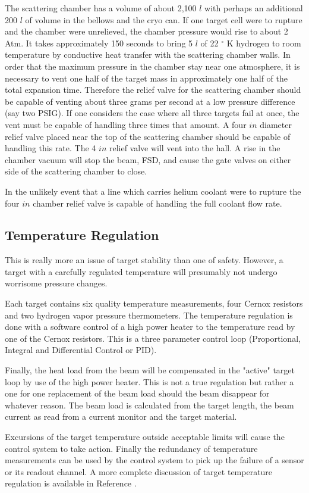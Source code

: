 {The scattering chamber has a volume of about 2,100 $l$ with perhaps an 
additional 200 $l$ of volume in the bellows and the cryo can.
If one target cell were to rupture and the chamber were unrelieved,
the chamber pressure would rise to about 2 Atm.
It takes approximately 150 seconds to
bring 5 $l$ of 22 $^\circ$ K hydrogen to room temperature
by conductive heat transfer with the scattering chamber walls.
In order that the maximum pressure 
in the chamber stay near one atmosphere, it is necessary to
vent one half of the target mass in approximately one half of the
total expansion time. Therefore the relief valve for the scattering chamber
should be capable of venting about three grams per second
at a low pressure difference (say two PSIG).
If one considers the case where all three targets
fail at once, the vent must be capable of handling three times
that amount. A four $in$ diameter relief valve placed near the
top of the scattering chamber should be capable of handling this rate.
The 4 $in$ relief valve will vent into the hall.
A rise in the chamber vacuum will stop the beam, FSD, and
cause the gate valves on either side of the scattering chamber to
close. 

In the unlikely event that a line which carries helium coolant
were to rupture the four $in$ chamber relief valve is capable
of handling the full coolant flow rate.

\subsection{ Temperature Regulation}

This is really more an issue of target stability than one of
safety. However, a target with a carefully regulated temperature
will presumably not undergo worrisome pressure changes.

Each target contains six quality temperature measurements, four Cernox
resistors and two hydrogen vapor pressure thermometers. The 
temperature regulation is done with a software control of a high power
heater
to the temperature read by one of the Cernox resistors.
This is a three parameter control loop (Proportional, Integral and Differential
Control or PID).

Finally, the heat load from the beam will be compensated in the "active"
target loop by use of the high power heater. This is not a true regulation
but rather a one for one replacement of the beam load should the beam
disappear for whatever reason. The beam load is calculated from the
target length, the beam current as read from a current monitor and
the target material.

Excursions of the target temperature outside acceptable limits will
cause the control system to take action.
Finally the redundancy of temperature measurements can be used by the
control system to pick up the failure of a sensor or its readout channel.
A more complete discussion of target temperature regulation is available
in Reference \cite{bi:tgts}.
}

